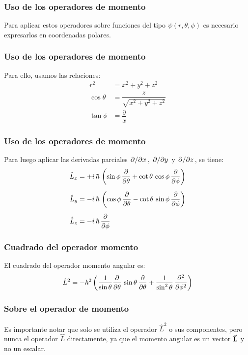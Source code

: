 \documentclass[12pt]{beamer}
\begin{document}
\begin{frame}
\frametitle{Uso de los operadores de momento}
Para aplicar estos operadores sobre funciones del tipo $\psi(r, \theta, \phi)$ es necesario expresarlos en coordenadas polares.
\end{frame}
\begin{frame}
\frametitle{Uso de los operadores de momento}
Para ello, usamos las relaciones:
\pause
\begin{align*}
r^{2} &= x^{2} + y^{2} +z^{2} \\
\cos \theta &= \dfrac{z}{\sqrt{x^{2} + y^{2} +z^{2}}} \\
\tan \phi &= \dfrac{y}{x}
\end{align*}
\end{frame}
\begin{frame}
\frametitle{Uso de los operadores de momento}
Para luego aplicar las derivadas parciales $\pdv*{x}$, $\pdv*{y}$ y $\pdv*{z}$, se tiene:
\begin{align}
\begin{aligned}
\hat{L}_{x} &= + i\, \hbar \, \left( \sin \phi \,\pdv{\theta} + \cot \theta\, \cos \phi \, \pdv{\phi} \right) \\[0.5em] 
\hat{L}_{y} &= - i\, \hbar \, \left( \cos \phi \,\pdv{\theta} - \cot \theta\, \sin \phi \, \pdv{\phi} \right) \\[0.5em] 
\hat{L}_{z} &= - i\, \hbar \, \pdv{\phi}
\end{aligned}
\label{eq:ecuacion_01_04a}
\end{align}
\end{frame}
\begin{frame}
\frametitle{Cuadrado del operador momento}
El cuadrado del operador momento angular es:
\pause
\begin{align}
\hat{L}^{2} = - \hbar^{2} \left( \dfrac{1}{\sin \theta} \pdv{\theta} \, \sin \theta \, \pdv{\theta} + \dfrac{1}{\sin^{2} \theta} \, \pdv[2]{\phi} \right)
\label{eq:ecuacion_01_04b}
\end{align}
\end{frame}
\begin{frame}
\frametitle{Sobre el operador de momento}
Es importante notar que solo se utiliza el operador $\hat{L}^{2}$ o sus componentes, pero nunca el operador $\hat{L}$ directamente, ya que el momento angular es un vector $\va{L}$ y no un escalar.
\end{frame}
\end{document}
